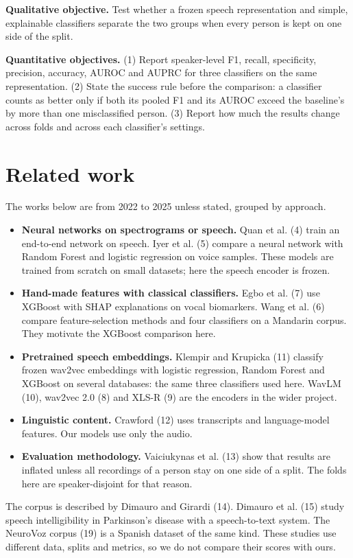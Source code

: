 \documentclass[11pt,a4paper]{article}
\begin{document}
\textbf{Qualitative objective.} Test whether a frozen speech representation and simple, explainable classifiers separate the two groups when every person is kept on one side of the split.

\textbf{Quantitative objectives.} (1) Report speaker-level F1, recall, specificity, precision, accuracy, AUROC and AUPRC for three classifiers on the same representation. (2) State the success rule before the comparison: a classifier counts as better only if both its pooled F1 and its AUROC exceed the baseline's by more than one misclassified person. (3) Report how much the results change across folds and across each classifier's settings.

\section{Related work}\label{sec:related}
The works below are from 2022 to 2025 unless stated, grouped by approach.

\begin{itemize}\item \textbf{Neural networks on spectrograms or speech.} Quan et al. (4) train an end-to-end network on speech. Iyer et al. (5) compare a neural network with Random Forest and logistic regression on voice samples. These models are trained from scratch on small datasets; here the speech encoder is frozen.
\item \textbf{Hand-made features with classical classifiers.} Egbo et al. (7) use XGBoost with SHAP explanations on vocal biomarkers. Wang et al. (6) compare feature-selection methods and four classifiers on a Mandarin corpus. They motivate the XGBoost comparison here.
\item \textbf{Pretrained speech embeddings.} Klempir and Krupicka (11) classify frozen wav2vec embeddings with logistic regression, Random Forest and XGBoost on several databases: the same three classifiers used here. WavLM (10), wav2vec 2.0 (8) and XLS-R (9) are the encoders in the wider project.
\item \textbf{Linguistic content.} Crawford (12) uses transcripts and language-model features. Our models use only the audio.
\item \textbf{Evaluation methodology.} Vaiciukynas et al. (13) show that results are inflated unless all recordings of a person stay on one side of a split. The folds here are speaker-disjoint for that reason.
\end{itemize}
The corpus is described by Dimauro and Girardi (14). Dimauro et al. (15) study speech intelligibility in Parkinson's disease with a speech-to-text system. The NeuroVoz corpus (19) is a Spanish dataset of the same kind. These studies use different data, splits and metrics, so we do not compare their scores with ours.
\end{document}
